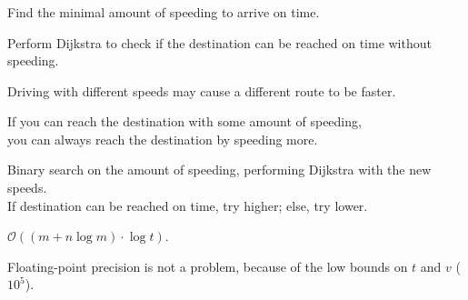 \begin{frame}
    \frametitle{\problemtitle}
    \begin{description}
        \item<+->[Problem:] Find the minimal amount of speeding to arrive on time.
        \item<+->[First check:] Perform Dijkstra to check if the destination can be reached on time without speeding.
        \item<+->[Observation:] Driving with different speeds may cause a different route to be faster.
        \item<+->[Observation:] If you can reach the destination with some amount of speeding, \\
            you can always reach the destination by speeding more.
        \item<+->[Solution:] Binary search on the amount of speeding, performing Dijkstra with the new speeds. \\
            If destination can be reached on time, try higher; else, try lower.
        \item<+->[Run time:] $\mathcal O((m + n \log m) \cdot \log t)$.
        \item<+->[Note:] Floating-point precision is not a problem, because of the low bounds on $t$ and $v$ ($10^5$).
    \end{description}
    \solvestats
\end{frame}
